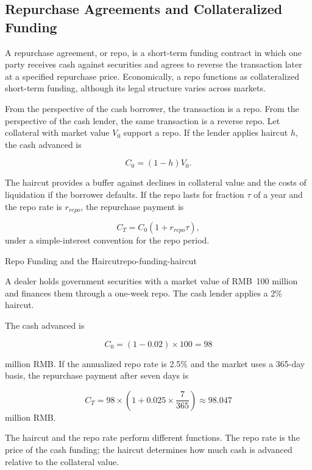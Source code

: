 \subsection{Repurchase Agreements and Collateralized Funding}

A repurchase agreement, or repo, is a short-term funding contract in which one party receives cash against securities and agrees to reverse the transaction later at a specified repurchase price. Economically, a repo functions as collateralized short-term funding, although its legal structure varies across markets.

From the perspective of the cash borrower, the transaction is a repo. From the perspective of the cash lender, the same transaction is a reverse repo. Let collateral with market value $V_0$ support a repo. If the lender applies haircut $h$, the cash advanced is

\begin{equation}
C_0=(1-h)V_0.
\label{eq:ch7-repo-cash-haircut}
\end{equation}

The haircut provides a buffer against declines in collateral value and the costs of liquidation if the borrower defaults. If the repo lasts for fraction $\tau$ of a year and the repo rate is $r_{repo}$, the repurchase payment is

\begin{equation}
C_T=C_0(1+r_{repo}\tau),
\label{eq:ch7-repo-repurchase-payment}
\end{equation}
under a simple-interest convention for the repo period.

\begin{example}{Repo Funding and the Haircut}{repo-funding-haircut}

A dealer holds government securities with a market value of RMB~100 million and finances them through a one-week repo. The cash lender applies a 2\% haircut.

The cash advanced is

\[
C_0=(1-0.02)\times100=98
\]

million RMB. If the annualized repo rate is 2.5\%  and the market uses a 365-day basis, the repurchase payment after seven days is

\[
C_T=98\times\left(1+0.025\times\frac{7}{365}\right)
\approx 98.047
\]
million RMB.

The haircut and the repo rate perform different functions. The repo rate is the price of the cash funding; the haircut determines how much cash is advanced relative to the collateral value.

\end{example}

